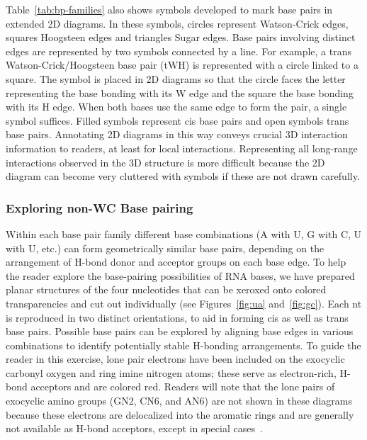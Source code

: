Table~\ref{tab:bp-families} also shows symbols developed to mark base pairs in extended 2D diagrams.
In these symbols, circles represent Watson-Crick edges, squares Hoogsteen edges
and triangles Sugar edges. Base pairs involving distinct edges are represented
by two symbols connected by a line. For example, a trans Watson-Crick/Hoogsteen
base pair (tWH) is represented with a circle linked to a square. The symbol is
placed in 2D diagrams so that the circle faces the letter representing the base
bonding with its W edge and the square the base bonding with its H edge. When
both bases use the same edge to form the pair, a single symbol suffices. Filled
symbols represent cis base pairs and open symbols trans base pairs. Annotating
2D diagrams in this way conveys crucial 3D interaction information to readers,
at least for local interactions. Representing all long-range interactions
observed in the 3D structure is more difficult because the 2D diagram can become
very cluttered with symbols if these are not drawn carefully. 

\subsubsection{Exploring non-WC Base pairing}

Within each base pair family different base combinations (A with U, G with C, U
with U, etc.) can form geometrically similar base pairs, depending on the
arrangement of H-bond donor and acceptor groups on each base edge. To help the
reader explore the base-pairing possibilities of RNA bases, we have prepared
planar structures of the four nucleotides that can be xeroxed onto colored
transparencies and cut out individually (see Figures~\ref{fig:ua}
and~\ref{fig:gc}). Each nt is reproduced in two distinct orientations, to aid in
forming cis as well as trans base pairs. Possible base pairs can be explored by
aligning base edges in various combinations to identify potentially stable
H-bonding arrangements. To guide the reader in this exercise, lone pair
electrons have been included on the exocyclic carbonyl oxygen and ring imine
nitrogen atoms; these serve as electron-rich, H-bond acceptors and are colored
red. Readers will note that the lone pairs of exocyclic amino groups (GN2, CN6,
and AN6) are not shown in these diagrams because these electrons are delocalized
into the aromatic rings and are generally not available as H-bond acceptors,
except in special cases~\cite{Zirbel2009, Sponer2003}.

